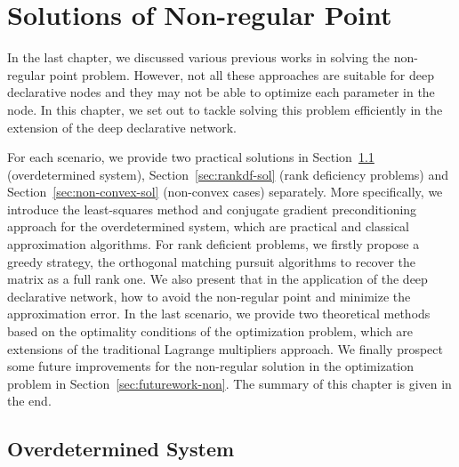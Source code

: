 \chapter{Solutions of Non-regular Point}
\label{cha:result}
In the last chapter, we discussed various previous works in solving the non-regular point problem. However, not all these approaches are suitable for deep declarative nodes and they may not be able to optimize each parameter in the node. In this chapter, we set out to tackle solving this problem efficiently in the extension of the deep declarative network. 
\par For each scenario, we provide two practical solutions in Section~\ref{sec:overdet-sol} (overdetermined system), Section~\ref{sec:rankdf-sol} (rank deficiency problems) and Section~\ref{sec:non-convex-sol} (non-convex cases) separately. More specifically, we introduce the least-squares method and conjugate gradient preconditioning approach for the overdetermined system, which are practical and classical approximation algorithms. For rank deficient problems, we firstly propose a greedy strategy, the orthogonal matching pursuit algorithms to recover the matrix as a full rank one. We also present that in the application of the deep declarative network, how to avoid the non-regular point and minimize the approximation error. In the last scenario, we provide two theoretical methods based on the optimality conditions of the optimization problem, which are extensions of the traditional Lagrange multipliers approach. We finally prospect some future improvements for the non-regular solution in the optimization problem in Section~\ref{sec:futurework-non}. The summary of this chapter is given in the end. 

\section{Overdetermined System}
\label{sec:overdet-sol}
